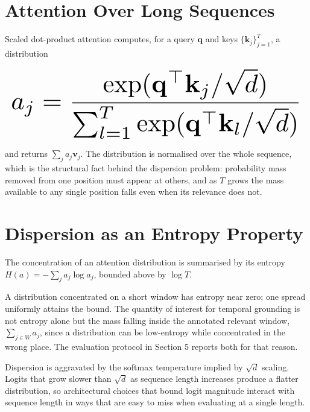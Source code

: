 \documentclass{article}
\begin{document}
\section{Attention Over Long Sequences}


Scaled dot-product attention computes, for a query $\mathbf{q}$ and keys $\{\mathbf{k}_j\}_{j=1}^{T}$, a distribution








\begin{equation}
\resizebox{\columnwidth}{!}{$\displaystyle
\begin{aligned}
a_j = \frac{\exp(\mathbf{q}^{\top}\mathbf{k}_j / \sqrt{d})}{\sum_{l=1}^{T} \exp(\mathbf{q}^{\top}\mathbf{k}_l / \sqrt{d})}
\end{aligned}
$}
\end{equation}








and returns $\sum_j a_j \mathbf{v}_j$. The distribution is normalised over the whole sequence, which is the structural fact behind the dispersion problem: probability mass removed from one position must appear at others, and as $T$ grows the mass available to any single position falls even when its relevance does not.


\section{Dispersion as an Entropy Property}


The concentration of an attention distribution is summarised by its entropy $H(a) = -\sum_j a_j \log a_j$, bounded above by $\log T$.

A distribution concentrated on a short window has entropy near zero; one spread uniformly attains the bound. The quantity of interest for temporal grounding is not entropy alone but the mass falling inside the annotated relevant window, $\sum_{j \in W} a_j$, since a distribution can be low-entropy while concentrated in the wrong place. The evaluation protocol in Section 5 reports both for that reason.

Dispersion is aggravated by the softmax temperature implied by $\sqrt{d}$ scaling. Logits that grow slower than $\sqrt{d}$ as sequence length increases produce a flatter distribution, so architectural choices that bound logit magnitude interact with sequence length in ways that are easy to miss when evaluating at a single length.
\end{document}
